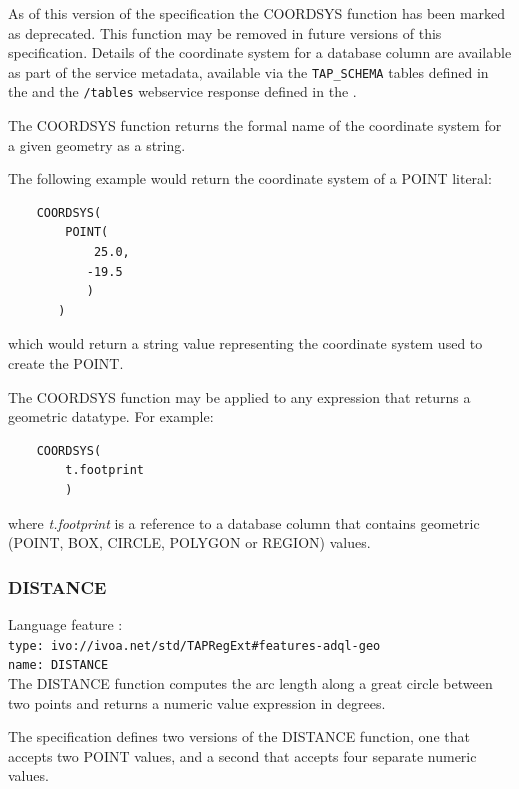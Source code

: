 \documentclass[11pt,a4paper]{ivoa}
\begin{document}
As of this version of the specification the COORDSYS function has
been marked as deprecated. This function may be removed in future versions
of this specification.
Details of the coordinate system for a database column are available as part of
the service metadata, available via the \verb:TAP_SCHEMA: tables defined in the
\TAPSpec{} and the \verb:/tables: webservice response defined in the \VOSISpec{}.


The COORDSYS function returns the formal name of the coordinate system for
a given geometry as a string.

The following example would return the coordinate system of a POINT literal:
\begin{verbatim}
    COORDSYS(
        POINT(
            25.0,
           -19.5
           )
       )
\end{verbatim}
\noindent
which would return a string value representing the coordinate system used
to create the POINT.

The COORDSYS function may be applied to any expression that returns a
geometric datatype. For example:
\begin{verbatim}
    COORDSYS(
        t.footprint
        )
\end{verbatim}
\noindent
where \textit{t.footprint} is a reference to a database column that
contains geometric (POINT, BOX, CIRCLE, POLYGON or REGION) values.

\subsubsection{DISTANCE}
\label{sec:functions.geom.distance}
{\footnotesize Language feature :}\\
{\footnotesize \verb|type: ivo://ivoa.net/std/TAPRegExt#features-adql-geo|}\\
{\footnotesize \verb|name: DISTANCE|}\\

The DISTANCE function computes the arc length along a great circle between two
points and returns a numeric value expression in degrees.

The specification defines two versions of the DISTANCE function, one that
accepts two POINT values, and a second that accepts four separate numeric
values.
\end{document}

